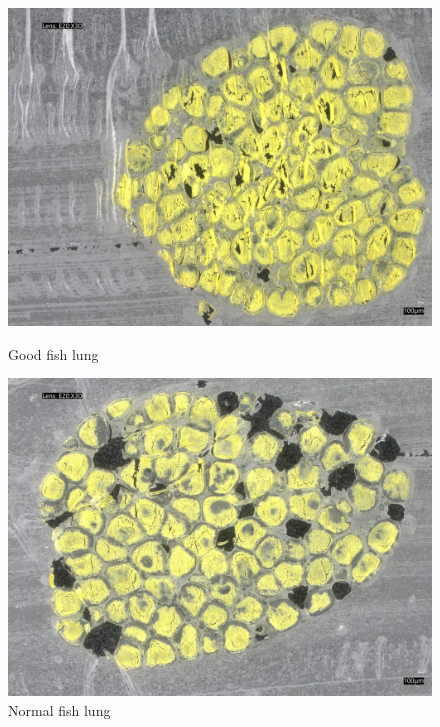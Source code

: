 \begin{figure}[H]
    \centering
    \begin{minipage}{0.45\textwidth}
        \centering
        \includegraphics[width=\textwidth]{./fig/fish_lung/good20240313_144138.jpg}
        \caption{Good fish lung}
        \label{fig:good_fish_lung}
    \end{minipage}
    \begin{minipage}{0.45\textwidth}
        \centering
        \includegraphics[width=\textwidth]{./fig/fish_lung/normal20240313_141726.jpg}
        \caption{Normal fish lung}
        \label{fig:noraml_fish_lung}
    \end{minipage}
\end{figure}

